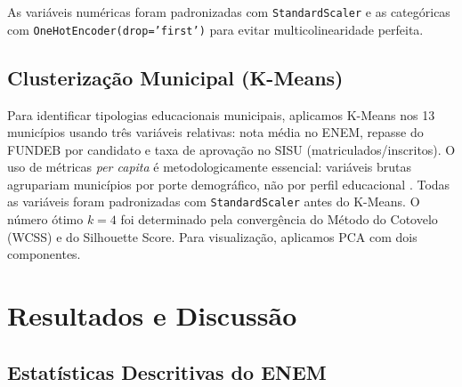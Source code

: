 \documentclass[12pt]{article}
\begin{document}
As variáveis numéricas foram padronizadas com \texttt{StandardScaler} e as categóricas
com \texttt{OneHotEncoder(drop='first')} para evitar multicolinearidade perfeita.

\subsection{Clusterização Municipal (K-Means)}

Para identificar tipologias educacionais municipais, aplicamos K-Means nos 13
municípios usando três variáveis relativas: nota média no ENEM, repasse do FUNDEB por
candidato e taxa de aprovação no SISU (matriculados/inscritos). O uso de métricas
\textit{per capita} é metodologicamente essencial: variáveis brutas agrupariam
municípios por porte demográfico, não por perfil educacional \cite{james2023}.
Todas as variáveis foram padronizadas com \texttt{StandardScaler} antes do K-Means.
O número ótimo $k=4$ foi determinado pela convergência do Método do Cotovelo (WCSS) e
do Silhouette Score. Para visualização, aplicamos PCA com dois componentes.

\section{Resultados e Discussão}
\label{sec:resultados}

\subsection{Estatísticas Descritivas do ENEM}
\end{document}
